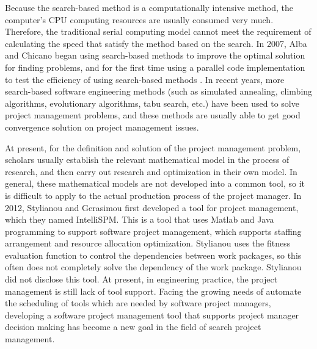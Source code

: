 Because the search-based method is a computationally intensive method, the
computer's CPU computing resources are usually consumed very much. Therefore,
the traditional serial computing model cannot meet the requirement of
calculating the speed that satisfy the method based on the search. In 2007, Alba
and Chicano began using search-based methods to improve the optimal solution for
finding problems, and for the first time using a parallel code implementation to
test the efficiency of using search-based methods \cite{pospichal}.  In recent
years, more search-based software engineering methods (such as simulated
annealing, climbing algorithms, evolutionary algorithms, tabu search, etc.) have
been used to solve project management problems, and these methods are usually
able to get good convergence solution on project management issues.

At present, for the definition and solution of the project management problem,
scholars usually establish the relevant mathematical model in the process of
research, and then carry out research and optimization in their own model. In
general, these mathematical models are not developed into a common tool, so it
is difficult to apply to the actual production process of the project
manager. In 2012, Stylianou and Gerasimou first developed a tool for project
management, which they named IntelliSPM\cite{stylianou}. This is a tool that
uses Matlab and Java programming to support software project management, which
supports staffing arrangement and resource allocation optimization. Stylianou
uses the fitness evaluation function to control the dependencies between work
packages, so this often does not completely solve the dependency of the work
package. Stylianou did not disclose this tool.  At present, in engineering
practice, the project management is still lack of tool support. Facing the
growing needs of automate the scheduling of tools which are needed by software
project managers, developing a software project management tool that supports
project manager decision making has become a new goal in the field of search
project management.

